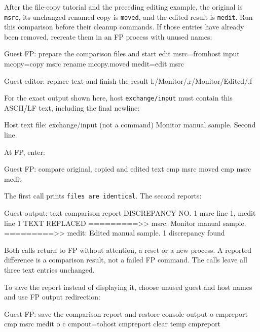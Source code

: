 After the file-copy tutorial and the preceding editing example, the original is \passthrough{\lstinline!msrc!}, its unchanged renamed copy is \passthrough{\lstinline!moved!}, and the edited result is \passthrough{\lstinline!medit!}. Run this comparison before their cleanup commands. If those entries have already been removed, recreate them in an FP process with unused names:

\begin{commandexample}{Guest FP: prepare the comparison files and start edit}
msrc=fromhost input
mcopy=copy msrc
rename mcopy.moved
medit=edit msrc
\end{commandexample}

\begin{commandexample}{Guest editor: replace text and finish the result}
l./Monitor/,r/Monitor/Edited/,f
\end{commandexample}

For the exact output shown here, host \passthrough{\lstinline!exchange/input!} must contain this ASCII/LF text, including the final newline:

\begin{commandexample}{Host text file: exchange/input (not a command)}
Monitor manual sample.
Second line.
\end{commandexample}

At FP, enter:

\begin{commandexample}{Guest FP: compare original, copied and edited text}
cmp msrc moved
cmp msrc medit
\end{commandexample}

The first call prints \passthrough{\lstinline!files are identical!}. The second reports:

\begin{commandexample}{Guest output: text comparison report}
DISCREPANCY NO. 1  msrc line 1, medit line 1  TEXT REPLACED
=========>> msrc:
Monitor manual sample.
=========>> medit:
Edited manual sample.
 1 discrepancy found
\end{commandexample}

Both calls return to FP without attention, a reset or a new process. A reported difference is a comparison result, not a failed FP command. The calls leave all three text entries unchanged.

To save the report instead of displaying it, choose unused guest and host names and use FP output redirection:

\begin{commandexample}{Guest FP: save the comparison report and restore console output}
o cmpreport
cmp msrc medit
o c
cmpout=tohost cmpreport
clear temp cmpreport
\end{commandexample}

